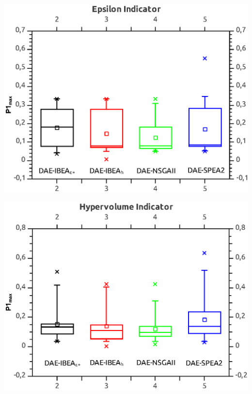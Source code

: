 \documentclass[a4paper,10pt]{report} %
\begin{document}
\begin{center}
 \includegraphics[bb=0 0 370 303]{./bp_p01_Max_eps.eps}
\end{center}
\begin{center}
 \includegraphics[bb=0 0 372 303]{./bp_p01_Max_hyp.eps}
\end{center}

\end{document}
